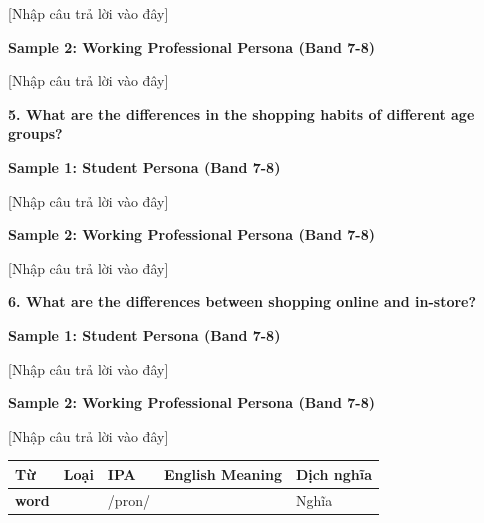 [Nhập câu trả lời vào đây]

\textbf{Sample 2: Working Professional Persona (Band 7-8)}

[Nhập câu trả lời vào đây]

\separator

\begin{ieltsquestion}
\textbf{5. What are the differences in the shopping habits of different age groups?}
\end{ieltsquestion}
\textbf{Sample 1: Student Persona (Band 7-8)}

[Nhập câu trả lời vào đây]

\textbf{Sample 2: Working Professional Persona (Band 7-8)}

[Nhập câu trả lời vào đây]

\separator

\begin{ieltsquestion}
\textbf{6. What are the differences between shopping online and in-store?}
\end{ieltsquestion}
\textbf{Sample 1: Student Persona (Band 7-8)}

[Nhập câu trả lời vào đây]

\textbf{Sample 2: Working Professional Persona (Band 7-8)}

[Nhập câu trả lời vào đây]

\separator


\vspace{0.8em}
\begin{center}
\renewcommand{\arraystretch}{1.65}
\begin{tabularx}{\textwidth}{|V{0.22\textwidth}|C{0.07\textwidth}|I{0.20\textwidth}|Y|V{0.18\textwidth}|}
\hline
{}
\textbf{Từ} & \textbf{Loại} & \textbf{IPA} & \textbf{English Meaning} & \textbf{Dịch nghĩa} \\
\hline
\textbf{word} & & /pron/ & & Nghĩa \\ \hline
\end{tabularx}
\end{center}

\newpage

